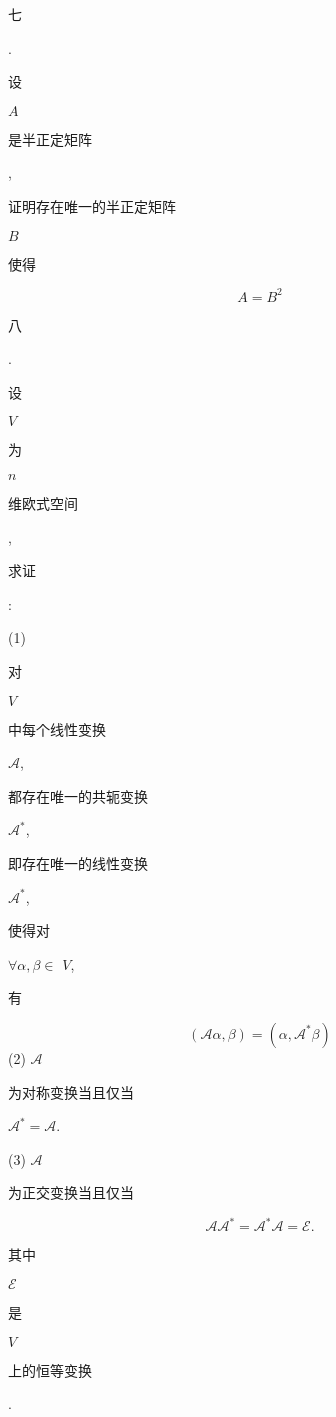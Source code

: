 \documentclass[10pt]{article}
\begin{document}
\begin{CJK}{UTF8}{mj}七\end{CJK}. \begin{CJK}{UTF8}{mj}设\end{CJK} $A$ \begin{CJK}{UTF8}{mj}是半正定矩阵\end{CJK}, \begin{CJK}{UTF8}{mj}证明存在唯一的半正定矩阵\end{CJK} $B$ \begin{CJK}{UTF8}{mj}使得\end{CJK}
$$
A=B^{2}
$$
\begin{CJK}{UTF8}{mj}八\end{CJK}. \begin{CJK}{UTF8}{mj}设\end{CJK} $V$ \begin{CJK}{UTF8}{mj}为\end{CJK} $n$ \begin{CJK}{UTF8}{mj}维欧式空间\end{CJK}, \begin{CJK}{UTF8}{mj}求证\end{CJK}:

(1) \begin{CJK}{UTF8}{mj}对\end{CJK} $V$ \begin{CJK}{UTF8}{mj}中每个线性变换\end{CJK} $\mathscr{A}$, \begin{CJK}{UTF8}{mj}都存在唯一的共轭变换\end{CJK} $\mathscr{A}^{*}$, \begin{CJK}{UTF8}{mj}即存在唯一的线性变换\end{CJK} $\mathscr{A}^{*}$, \begin{CJK}{UTF8}{mj}使得对\end{CJK} $\forall \alpha, \beta \in$ $V$, \begin{CJK}{UTF8}{mj}有\end{CJK}
$$
(\mathscr{A} \alpha, \beta)=\left(\alpha, \mathscr{A}^{*} \beta\right)
$$
(2) $\mathscr{A}$ \begin{CJK}{UTF8}{mj}为对称变换当且仅当\end{CJK} $\mathscr{A}^{*}=\mathscr{A}$.

(3) $\mathscr{A}$ \begin{CJK}{UTF8}{mj}为正交变换当且仅当\end{CJK}
$$
\mathscr{A} \mathscr{A}^{*}=\mathscr{A}^{*} \mathscr{A}=\mathscr{E} .
$$
\begin{CJK}{UTF8}{mj}其中\end{CJK} $\mathscr{E}$ \begin{CJK}{UTF8}{mj}是\end{CJK} $V$ \begin{CJK}{UTF8}{mj}上的恒等变换\end{CJK}.
\end{document}
